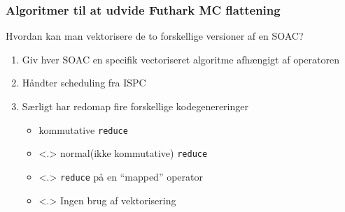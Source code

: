\documentclass[t]{beamer}
\begin{document}

\begin{frame}
  \frametitle{Algoritmer til at udvide Futhark MC flattening}
  Hvordan kan man vektorisere de to forskellige versioner af en SOAC?
  \begin{enumerate}
  \item<+-> Giv hver SOAC en specifik vectoriseret algoritme afhængigt af operatoren
  \item<+-> Håndter scheduling fra ISPC
  \item<+-> Særligt har redomap fire forskellige kodegenereringer
    \begin{itemize}
    \item<+-> kommutative \texttt{reduce}
    \item<.> normal(ikke kommutative) \texttt{reduce}
    \item<.> \texttt{reduce} på en ``mapped'' operator
    \item<.> Ingen brug af vektorisering
    \end{itemize}
  \end{enumerate}
\end{frame}
\end{document}
